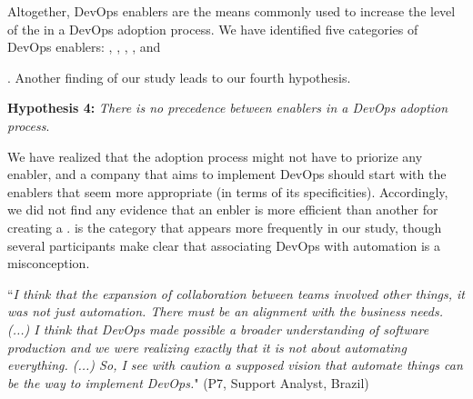
Altogether, DevOps enablers are the means commonly used to increase the level of
the \cc in a DevOps adoption process.
We have identified five categories of DevOps enablers:
, , ,
, and {. Another finding of our
study leads to our fourth hypothesis.

\begin{mh}
\textbf{Hypothesis 4:} \textit{There is no precedence between enablers in a DevOps adoption process}.
\end{mh}

We have realized that the adoption process might not have
to priorize any enabler, and a company that aims to implement
DevOps should start with  the enablers that seem more appropriate (in terms
of its specificities). Accordingly, we did not find any evidence that an enbler
is more efficient than another for creating a \cc.  is the category
that appears more frequently in our study, though several participants make
clear that associating DevOps with automation is a misconception.

\begin{mq}
``\emph{I think that the expansion of collaboration between teams involved other
things, it was not just automation. There must be an alignment with the
business needs. (...) I think that DevOps made possible a broader understanding
of software production and we were realizing exactly that it is not about
automating everything. (...) So, I see with caution a supposed vision that automate things can
be the way to implement DevOps.}" (P7, Support Analyst, Brazil)
\end{mq}


}
